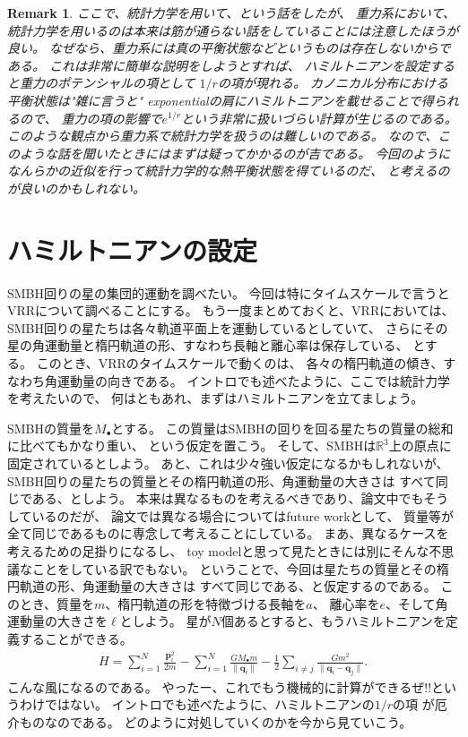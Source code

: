 \documentclass[10pt, pre, twocolumn, showpacs, aps]{revtex4-1}
\newtheorem{remark}{Remark}
\begin{document}
\begin{remark}
ここで、統計力学を用いて、という話をしたが、
重力系において、統計力学を用いるのは本来は筋が通らない話をしていることには注意したほうが良い。
なぜなら、重力系には真の平衡状態などというものは存在しないからである。
これは非常に簡単な説明をしようとすれば、
ハミルトニアンを設定すると重力のポテンシャルの項として
$1/r$の項が現れる。
カノニカル分布における平衡状態は"雑に言うと"
exponentialの肩にハミルトニアンを載せることで得られるので、
重力の項の影響で$e^{1/r}$という非常に扱いづらい計算が生じるのである。
このような観点から重力系で統計力学を扱うのは難しいのである。
なので、このような話を聞いたときにはまずは疑ってかかるのが吉である。
今回のようになんらかの近似を行って統計力学的な熱平衡状態を得ているのだ、
と考えるのが良いのかもしれない。	
\end{remark}

\section{ハミルトニアンの設定}
SMBH回りの星の集団的運動を調べたい。
今回は特にタイムスケールで言うとVRRについて調べることにする。
もう一度まとめておくと、VRRにおいては、
SMBH回りの星たちは各々軌道平面上を運動しているとしていて、
さらにその星の角運動量と楕円軌道の形、すなわち長軸と離心率は保存している、
とする。
このとき、VRRのタイムスケールで動くのは、
各々の楕円軌道の傾き、すなわち角運動量の向きである。
イントロでも述べたように、ここでは統計力学を考えたいので、
何はともあれ、まずはハミルトニアンを立てましょう。

SMBHの質量を$M_{\bullet}$とする。
この質量はSMBHの回りを回る星たちの質量の総和に比べてもかなり重い、
という仮定を置こう。
そして、SMBHは$\mathbb{R}^{3}$上の原点に固定されているとしよう。
あと、これは少々強い仮定になるかもしれないが、
SMBH回りの星たちの質量とその楕円軌道の形、角運動量の大きさは
すべて同じである、としよう。
本来は異なるものを考えるべきであり、論文中でもそうしているのだが、
論文では異なる場合についてはfuture workとして、
質量等が全て同じであるものに専念して考えることにしている。
まあ、異なるケースを考えるための足掛りになるし、
toy modelと思って見たときには別にそんな不思議なことをしている訳でもない。
ということで、今回は星たちの質量とその楕円軌道の形、角運動量の大きさは
すべて同じである、と仮定するのである。
このとき、質量を$m$、楕円軌道の形を特徴づける長軸を$a$、
離心率を$e$、そして角運動量の大きさを$\ell$としよう。
星が$N$個あるとすると、もうハミルトニアンを定義することができる。
\begin{align}
H=\sum_{i=1}^{N}\frac{\pmb{p}_{i}^{2}}{2m}
-\sum_{i=1}^{N}\frac{GM_{\bullet}m}{\|\pmb{q}_{i}\|}
-\frac{1}{2}\sum_{i\ne j}\frac{Gm^{2}}{\|\pmb{q}_{i}-\pmb{q}_{j}\|}.
\end{align}
こんな風になるのである。
やったー、これでもう機械的に計算ができるぜ!!というわけではない。
イントロでも述べたように、ハミルトニアンの$1/r$の項
が厄介ものなのである。
どのように対処していくのかを今から見ていこう。
\end{document}
